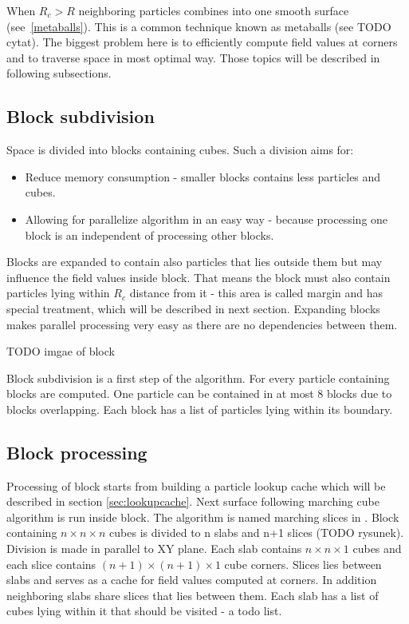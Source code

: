 When $R_c > R$ neighboring particles combines into one smooth surface  (see~\ref{metaballs}). This is a common technique known as metaballs (see TODO cytat). The biggest problem here is to efficiently compute field values at corners and to traverse space in most optimal way. Those topics will be described in following subsections.
 

\subsection{Block subdivision} \label{sec:block_subdivision}
Space is divided into blocks containing cubes. Such a division aims for:
\begin{itemize}
\item Reduce memory consumption - smaller blocks contains less particles and cubes. 
\item Allowing for parallelize algorithm in an easy way - because processing one block is an independent of processing other blocks. 
\end{itemize}
Blocks are expanded to contain also particles that lies outside them but may influence the field values inside block. That means the block must also contain particles lying within $R_c$ distance from it - this area is called margin and has special treatment, which will be described in next section. Expanding blocks makes parallel processing very easy as there are no dependencies between them.

TODO imgae of block

Block subdivision is a first step of the algorithm. For every particle containing blocks are computed. One particle can be contained in at most 8 blocks due to blocks overlapping. Each block has a list of particles lying within its boundary. 

\subsection{Block processing} \label{sec:block_processing}
Processing of block starts from building a particle lookup cache which will be described in section \ref{sec:lookupcache}. Next surface following marching cube algorithm is run inside block. The algorithm is named marching slices in \cite{RosenbergBirdwell2008}. Block containing $n \times n \times n$ cubes is divided to n slabs and n+1 slices (TODO rysunek). Division is made in parallel to XY plane. Each slab contains $n \times n \times 1$ cubes and each slice contains $(n+1) \times (n+1) \times 1$ cube corners. Slices lies between slabs and serves as a cache for field values computed at corners. In addition neighboring slabs share slices that lies between them. Each slab has a list of cubes lying within it that should be visited - a todo list.

